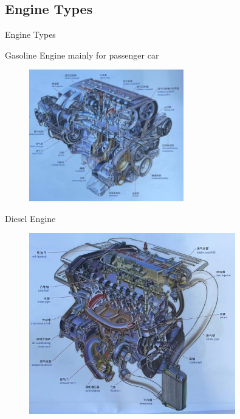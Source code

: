 \subsection{Engine Types}
\begin{frame}{Engine Types}	%
	\begin{block}{Gasoline Engine}
		mainly for passenger car
		\begin{figure}[htbp]
			\centering
			\includegraphics[width=0.6\textwidth]{2-2}
		\end{figure}
	\end{block}
\end{frame}
\begin{frame}
	\begin{block}{Diesel Engine}
		\begin{figure}[htbp]
			\centering
			\includegraphics[width=0.8\textwidth]{2-3}
		\end{figure}
	\end{block}
\end{frame}
